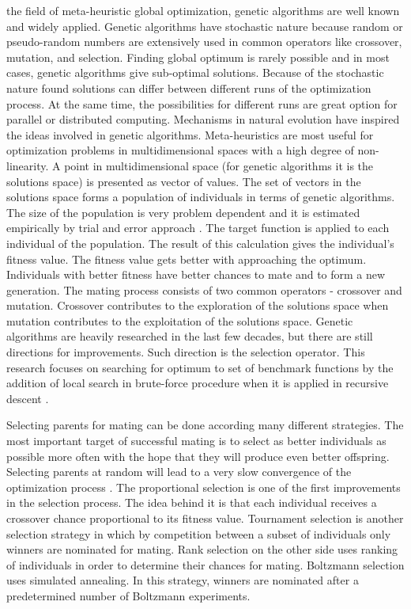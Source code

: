 \documentclass[conference]{IEEEtran}
\begin{document}
 the field of meta-heuristic global optimization, genetic algorithms are well known and widely applied. Genetic algorithms have stochastic nature because random or pseudo-random numbers are extensively used in common operators like crossover, mutation, and selection. Finding global optimum is rarely possible and in most cases, genetic algorithms give sub-optimal solutions. Because of the stochastic nature found solutions can differ between different runs of the optimization process. At the same time, the possibilities for different runs are great option for parallel or distributed computing. Mechanisms in natural evolution have inspired the ideas involved in genetic algorithms. Meta-heuristics are most useful for optimization problems in multidimensional spaces with a high degree of non-linearity. A point in multidimensional space (for genetic algorithms it is the solutions space) is presented as vector of values. The set of vectors in the solutions space forms a population of individuals in terms of genetic algorithms. The size of the population is very problem dependent and it is estimated empirically by trial and error approach \cite{alander-01}. The target function is applied to each individual of the population. The result of this calculation gives the individual's fitness value. The fitness value gets better with approaching the optimum. Individuals with better fitness have better chances to mate and to form a new generation. The mating process consists of two common operators - crossover and mutation. Crossover contributes to the exploration of the solutions space when mutation contributes to the exploitation of the solutions space. Genetic algorithms are heavily researched in the last few decades, but there are still directions for improvements. Such direction is the selection operator. This research focuses on searching for optimum to set of benchmark functions by the addition of local search \cite{fellows-01} in brute-force procedure when it is applied in recursive descent \cite{gelfand-01}. 

Selecting parents for mating can be done according many different strategies. The most important target of successful mating is to select as better individuals as possible more often with the hope that they will produce even better offspring. Selecting parents at random will lead to a very slow convergence of the optimization process \cite{wang-01}. The proportional selection \cite{back-01} is one of the first improvements in the selection process. The idea behind it is that each individual receives a crossover chance proportional to its fitness value. Tournament selection \cite{miller-01} is another selection strategy in which by competition between a subset of individuals only winners are nominated for mating. Rank selection \cite{grefenstette-01} on the other side uses ranking of individuals in order to determine their chances for mating. Boltzmann selection \cite{goldberg-01} uses simulated annealing. In this strategy, winners are nominated after a predetermined number of Boltzmann experiments. 
\end{document}
